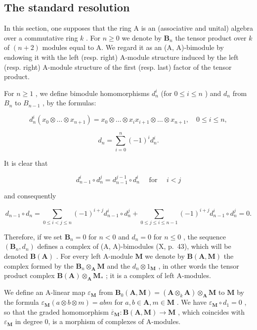 \subsection{The standard resolution}

In this section, one supposes that the ring A is an (associative and unital) algebra over a commutative ring \(k\) . For \(n \geqslant 0\) we denote by \(\mathbf{B}_n\) the tensor product over \(k\) of \((n + 2)\) modules equal to A. We regard it as an (A, A)-bimodule by endowing it with the left (resp. right) A-module structure induced by the left (resp. right) A-module structure of the first (resp. last) factor of the tensor product.

For \(n \geqslant 1\) , we define bimodule homomorphisms \(d_n^i\) (for \(0 \leqslant i \leqslant n\) ) and \(d_n\) from \(B_n\) to \(B_{n-1}\) , by the formulas:

\[
d _ {n} ^ {i} (x _ {0} \otimes \ldots \otimes x _ {n + 1}) = x _ {0} \otimes \ldots \otimes x _ {i} x _ {i + 1} \otimes \ldots \otimes x _ {n + 1}, \quad 0 \leqslant i \leqslant n,
\]

\[
d _ {n} = \sum_ {i = 0} ^ {n} (- 1) ^ {i} d _ {n} ^ {i}.
\]

It is clear that

\[
d _ {n - 1} ^ {i} \circ d _ {n} ^ {j} = d _ {n - 1} ^ {j - 1} \circ d _ {n} ^ {i} \quad \text { for } \quad i <   j
\]

and consequently

\[
d _ {n - 1} \circ d _ {n} = \sum_ {0 \leqslant i <   j \leqslant n} (- 1) ^ {i + j} d _ {n - 1} ^ {i} \circ d _ {n} ^ {j} + \sum_ {0 \leqslant j \leqslant i \leqslant n - 1} (- 1) ^ {i + j} d _ {n - 1} ^ {i} \circ d _ {n} ^ {j} = 0.
\]

Therefore, if we set \(\mathbf{B}_n = 0\) for \(n < 0\) and \(d_n = 0\) for \(n \leqslant 0\) , the sequence \((\mathbf{B}_n, d_n)\) defines a complex of (A, A)-bimodules (X, p.~43), which will be denoted \(\mathbf{B}(\mathbf{A})\) . For every left A-module \(\mathbf{M}\) we denote by \(\mathbf{B}(\mathbf{A}, \mathbf{M})\) the complex formed by the \(\mathbf{B}_n \otimes_{\mathbf{A}} \mathbf{M}\) and the \(d_n \otimes 1_{\mathbf{M}}\) , in other words the tensor product complex \(\mathbf{B}(\mathbf{A}) \otimes_{\mathbf{A}} \mathbf{M}_{*}\) ; it is a complex of left A-modules.

We define an A-linear map \(\varepsilon_{\mathbf{M}}\) from \(\mathbf{B}_{0}(\mathbf{A},\mathbf{M}) = (\mathbf{A}\otimes_{k}\mathbf{A})\otimes_{\mathbf{A}}\mathbf{M}\) to \(\mathbf{M}\) by the formula \(\varepsilon_{\mathbf{M}}(a\otimes b\otimes m) = abm\) for \(a,b\in \mathbf{A},m\in \mathbf{M}\) . We have \(\varepsilon_{\mathbf{M}}\circ d_1 = 0\) , so that the graded homomorphism \(\overline{\varepsilon}_{\mathbf{M}}:\mathbf{B}(\mathbf{A},\mathbf{M})\to \mathbf{M}\) , which coincides with \(\varepsilon_{\mathbf{M}}\) in degree 0, is a morphism of complexes of A-modules.

